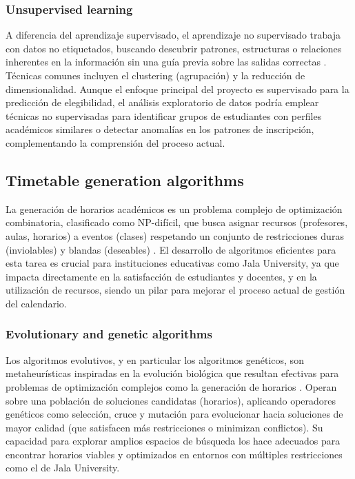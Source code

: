 \subsubsection{Unsupervised learning}
A diferencia del aprendizaje supervisado, el aprendizaje no supervisado trabaja con datos no etiquetados, buscando descubrir patrones, estructuras o relaciones inherentes en la información sin una guía previa sobre las salidas correctas \parencite{Hastie2009}. Técnicas comunes incluyen el clustering (agrupación) y la reducción de dimensionalidad. Aunque el enfoque principal del proyecto es supervisado para la predicción de elegibilidad, el análisis exploratorio de datos podría emplear técnicas no supervisadas para identificar grupos de estudiantes con perfiles académicos similares o detectar anomalías en los patrones de inscripción, complementando la comprensión del proceso actual.

\subsection{Timetable generation algorithms}
La generación de horarios académicos es un problema complejo de optimización combinatoria, clasificado como NP-difícil, que busca asignar recursos (profesores, aulas, horarios) a eventos (clases) respetando un conjunto de restricciones duras (inviolables) y blandas (deseables) \parencite{Schaerf1999}. El desarrollo de algoritmos eficientes para esta tarea es crucial para instituciones educativas como Jala University, ya que impacta directamente en la satisfacción de estudiantes y docentes, y en la utilización de recursos, siendo un pilar para mejorar el proceso actual de gestión del calendario.

\subsubsection{Evolutionary and genetic algorithms}
Los algoritmos evolutivos, y en particular los algoritmos genéticos, son metaheurísticas inspiradas en la evolución biológica que resultan efectivas para problemas de optimización complejos como la generación de horarios \parencite{Eiben2003}. Operan sobre una población de soluciones candidatas (horarios), aplicando operadores genéticos como selección, cruce y mutación para evolucionar hacia soluciones de mayor calidad (que satisfacen más restricciones o minimizan conflictos). Su capacidad para explorar amplios espacios de búsqueda los hace adecuados para encontrar horarios viables y optimizados en entornos con múltiples restricciones como el de Jala University.

